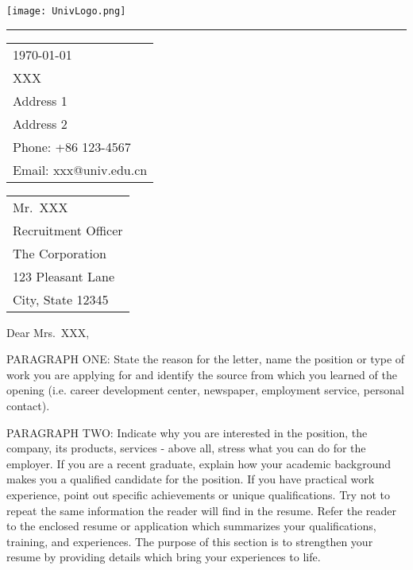 \documentclass[11pt]{article}
\begin{document}

\texttt{[image: UnivLogo.png]} %

\vspace{-1em} %

\rule{\linewidth}{1pt} %

\vspace{1.5em} %


\hfill
\begin{tabular}{l @{}}
	\today \bigskip\\ %
	XXX \\
	Address 1 \\ %
	Address 2 \\
	Phone: +86 123-4567 \\
	Email: xxx@univ.edu.cn
\end{tabular}

\bigskip


\begin{tabular}{@{} l}
	Mr.\ XXX \\
	Recruitment Officer \\
	The Corporation \\
	123 Pleasant Lane \\
	City, State 12345
\end{tabular}

\bigskip

Dear Mrs.\ XXX,

\bigskip


PARAGRAPH ONE: State the reason for the letter, name the position or type of work you are applying for and identify the source from which you learned of the opening (i.e. career development center, newspaper, employment service, personal contact).

PARAGRAPH TWO: Indicate why you are interested in the position, the company, its products, services - above all, stress what you can do for the employer. If you are a recent graduate, explain how your academic background makes you a qualified candidate for the position. If you have practical work experience, point out specific achievements or unique qualifications. Try not to repeat the same information the reader will find in the resume. Refer the reader to the enclosed resume or application which summarizes your qualifications, training, and experiences. The purpose of this section is to strengthen your resume by providing details which bring your experiences to life.
\end{document}
